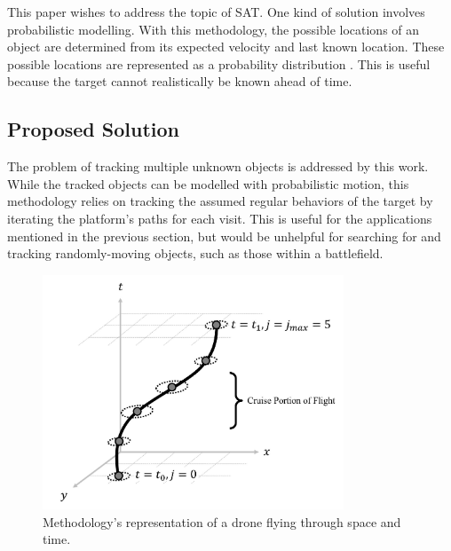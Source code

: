 \documentclass[conf]{new-aiaa}
\begin{document}
This paper wishes to address the topic of SAT. One kind of solution involves probabilistic modelling. With this methodology, the possible locations of an object are determined from its expected velocity and last known location. These possible locations are represented as a probability distribution \cite{probabilisticSearch}. This is useful because the target cannot realistically be known ahead of time.

\subsection{Proposed Solution}
The problem of tracking multiple unknown objects is addressed by this work. While the tracked objects can be modelled with probabilistic motion, this methodology relies on tracking the assumed regular behaviors of the target by iterating the platform's paths for each visit. This is useful for the applications mentioned in the previous section, but would be unhelpful for searching for and tracking randomly-moving objects, such as those within a battlefield.

\begin{figure}[hbt!]
\centering
\includegraphics[width=0.8\textwidth]{figs/drone-path-concept}
\caption{Methodology's representation of a drone flying through space and time.}
\label{drone-path-concept}
\end{figure}
\end{document}
